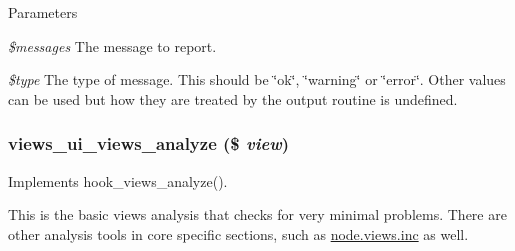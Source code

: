 \begin{DoxyParams}{Parameters}
\item[{\em \$messages}]The message to report. \item[{\em \$type}]The type of message. This should be \char`\"{}ok\char`\"{}, \char`\"{}warning\char`\"{} or \char`\"{}error\char`\"{}. Other values can be used but how they are treated by the output routine is undefined. \end{DoxyParams}
\hypertarget{analyze_8inc_abda4985a58e7461d134687a85c92f65f}{
\subsubsection[{views\_\-ui\_\-views\_\-analyze}]{\setlength{\rightskip}{0pt plus 5cm}views\_\-ui\_\-views\_\-analyze (\$ {\em view})}}
\label{analyze_8inc_abda4985a58e7461d134687a85c92f65f}
Implements hook\_\-views\_\-analyze().

This is the basic views analysis that checks for very minimal problems. There are other analysis tools in core specific sections, such as \hyperlink{node_8views_8inc}{node.views.inc} as well. 